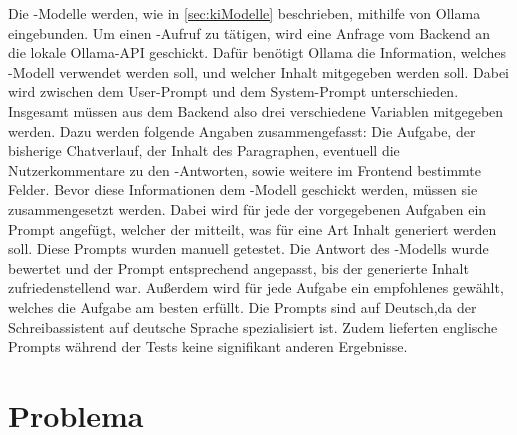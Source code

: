 \documentclass[../main.tex]{subfiles}
\begin{document}
Die -Modelle werden, wie in \autoref{sec:kiModelle} beschrieben, mithilfe von Ollama eingebunden. Um einen -Aufruf zu tätigen, wird eine Anfrage vom Backend an die lokale 
Ollama-API geschickt. Dafür benötigt Ollama die Information, welches -Modell verwendet werden soll, und welcher Inhalt mitgegeben werden soll. Dabei wird zwischen dem User-Prompt 
und dem System-Prompt unterschieden. Insgesamt müssen aus dem Backend also drei verschiedene Variablen mitgegeben werden. Dazu werden folgende Angaben zusammengefasst: Die Aufgabe, 
der bisherige Chatverlauf, der Inhalt des Paragraphen, eventuell die Nutzerkommentare zu den -Antworten, sowie weitere im Frontend bestimmte Felder. Bevor diese Informationen dem 
-Modell geschickt werden, müssen sie zusammengesetzt werden. Dabei wird für jede der vorgegebenen Aufgaben ein Prompt angefügt, welcher der  
mitteilt, was für eine Art Inhalt generiert werden soll. Diese Prompts wurden manuell getestet. Die Antwort des -Modells wurde bewertet und der Prompt entsprechend angepasst, bis der generierte Inhalt zufriedenstellend war.
Außerdem wird für jede Aufgabe ein empfohlenes  gewählt, welches die Aufgabe am besten erfüllt. Die Prompts sind auf Deutsch,da der Schreibassistent auf deutsche 
Sprache spezialisiert ist. Zudem lieferten englische Prompts während der Tests keine signifikant anderen Ergebnisse. 

\section{Problema}
\end{document}
